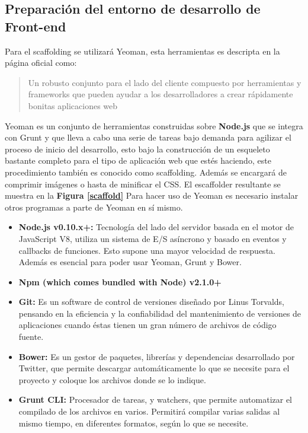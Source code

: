 \subsection{Preparación del entorno de desarrollo de Front-end}
Para el scaffolding se utilizará Yeoman, esta herramientas es descripta en la página oficial como:
\begin{quote}Un robusto conjunto para el lado del cliente compuesto por herramientas y frameworks que pueden ayudar a los desarrolladores a crear rápidamente bonitas aplicaciones web
\end {quote}


Yeoman es un conjunto de herramientas construidas sobre\textbf{ Node.js} que se integra con Grunt y que lleva a cabo una serie de tareas bajo demanda para agilizar el proceso de inicio del desarrollo, esto bajo  la construcción de un esqueleto bastante completo para el tipo de aplicación web que estés haciendo, este procedimiento también es conocido como scaffolding. Además se encargará de comprimir imágenes o hasta de minificar el CSS.
El escaffolder resultante se muestra en la \textbf{Figura \ref{scaffold}}
Para hacer uso de Yeoman es necesario instalar otros programas a parte de Yeoman en sí mismo.
\begin{itemize}
\item \textbf{Node.js v0.10.x+:} Tecnología del lado del servidor basada en el motor  de JavaScript V8, utiliza un sistema de E/S asíncrono y basado en eventos y callbacks de funciones. Esto supone una mayor velocidad de respuesta. Además es esencial para poder usar Yeoman, Grunt y Bower.
\item \textbf{Npm (which comes bundled with Node) v2.1.0+}
\item \textbf{Git:} Es un software de control de versiones diseñado por Linus Torvalds, pensando en la eficiencia y la confiabilidad del mantenimiento de versiones de aplicaciones cuando éstas tienen un gran número de archivos de código fuente.
\item \textbf{Bower:} Es un gestor de paquetes, librerías y dependencias desarrollado por Twitter, que permite descargar automáticamente lo que se necesite para el proyecto y coloque los archivos donde se lo indique. 
\item \textbf{Grunt CLI:} Procesador de tareas, y watchers, que permite automatizar el compilado de los archivos en varios. Permitirá compilar varias salidas al mismo tiempo, en diferentes formatos, según lo que se necesite.
\end{itemize}


